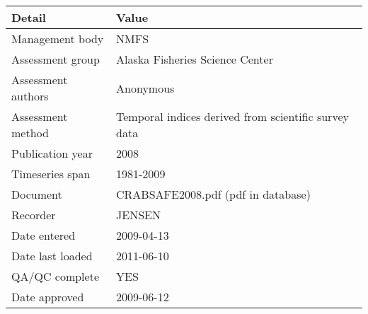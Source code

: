 \begin{table}[htb]
\centering
\begin{tabular}{lp{7cm}}
\toprule
Detail & Value \\
\midrule
Management body    & NMFS                                                 \\
Assessment group   & Alaska Fisheries Science Center                      \\
Assessment authors & Anonymous                                            \\
Assessment method  & Temporal indices derived from scientific survey data \\
Publication year   & 2008                                                 \\
Timeseries span    & 1981-2009                                            \\
Document           & CRABSAFE2008.pdf (pdf in database)                   \\
Recorder           & JENSEN                                               \\
Date entered       & 2009-04-13                                           \\
Date last loaded   & 2011-06-10                                           \\
QA/QC complete     & YES                                                  \\
Date approved      & 2009-06-12                                           \\
\bottomrule
\end{tabular}
\label{tab:assessdet}
\end{table}
